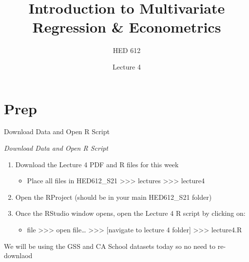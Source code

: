 \documentclass[
  8pt,
  ignorenonframetext,
  dvipsnames]{beamer}
\title{Introduction to Multivariate Regression \& Econometrics}
\subtitle{HED 612}
\author{Lecture 4}
\date{}
\providecommand{\tightlist}{%
  \setlength{\itemsep}{0pt}\setlength{\parskip}{0pt}}
\let\olditem\item
\renewcommand{\item}{%
  \olditem\vspace{4pt}
}
\begin{document}
\frame{\titlepage}

\begin{frame}
  \tableofcontents[hideallsubsections]
\end{frame}
\hypertarget{prep}{%
\section{Prep}\label{prep}}

\begin{frame}{Download Data and Open R Script}
\protect\hypertarget{download-data-and-open-r-script}{}

\emph{Download Data and Open R Script}

\begin{enumerate}
\tightlist
\item
  Download the Lecture 4 PDF and R files for this week

  \begin{itemize}
  \tightlist
  \item
    Place all files in HED612\_S21
    \textgreater\textgreater\textgreater{} lectures
    \textgreater\textgreater\textgreater{} lecture4
  \end{itemize}
\item
  Open the RProject (should be in your main HED612\_S21 folder)
\item
  Once the RStudio window opens, open the Lecture 4 R script by clicking
  on:

  \begin{itemize}
  \tightlist
  \item
    file \textgreater\textgreater\textgreater{} open file\ldots{}
    \textgreater\textgreater\textgreater{} {[}navigate to lecture 4
    folder{]} \textgreater\textgreater\textgreater{} lecture4.R
  \end{itemize}
\end{enumerate}

\medskip

We will be using the GSS and CA School datasets today so no need to
re-downlaod

\end{frame}
\end{document}
